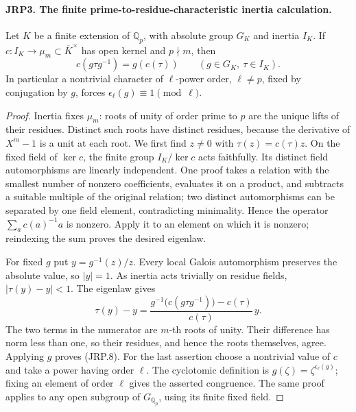 \documentclass[11pt,a4paper]{article}
\numberwithin{equation}{section}
\theoremstyle{remark}\newtheorem{remark}[theorem]{Remark}
\begin{document}
\paragraph{JRP3. The finite prime-to-residue-characteristic inertia calculation.}
\label{claim:JRP3}
Let \(K\) be a finite extension of \(\mathbb Q_p\), with
absolute group \(G_K\) and inertia \(I_K\).  If
\(c:I_K\to\mu_m\subset\overline K^\times\) has open kernel
and \(p\nmid m\), then
\[
 c(g\tau g^{-1})=g(c(\tau))
       \qquad(g\in G_K,\ \tau\in I_K).
 \tag{JRP.8}
\]
In particular a nontrivial character of \(\ell\)-power order,
\(\ell\ne p\), fixed by conjugation by \(g\), forces
\(\epsilon_\ell(g)\equiv1\pmod\ell\).
\begin{proof}
Inertia fixes \(\mu_m\): roots of unity of order prime to \(p\)
are the unique lifts of their residues.  Distinct such roots have
distinct residues, because the derivative of \(X^m-1\) is a unit
at each root.  We first find \(z\ne0\) with
\(\tau(z)=c(\tau)z\).  On the fixed field of \(\ker c\),
the finite group \(I_K/\ker c\) acts faithfully.  Its distinct
field automorphisms are linearly independent.  One proof takes a
relation with the smallest number of nonzero coefficients,
evaluates it on a product, and subtracts a suitable multiple of the
original relation; two distinct automorphisms can be separated by
one field element, contradicting minimality.  Hence the operator
\(\sum_a c(a)^{-1}a\) is nonzero.  Apply it to an element on
which it is nonzero; reindexing the sum proves the desired eigenlaw.

For fixed \(g\) put \(y=g^{-1}(z)/z\).  Every local Galois
automorphism preserves the absolute value, so \(|y|=1\).
As inertia acts trivially on residue fields,
\(|\tau(y)-y|<1\).  The eigenlaw gives
\[
 \tau(y)-y=
 \frac{g^{-1}\bigl(c(g\tau g^{-1})\bigr)-c(\tau)}{c(\tau)}\,y.
\]
The two terms in the numerator are \(m\)-th roots of unity.
Their difference has norm less than one, so their residues, and
hence the roots themselves, agree.  Applying \(g\) proves
(JRP.8).  For the last assertion choose a nontrivial value of
\(c\) and take a power having order \(\ell\).
The cyclotomic definition is
\(g(\zeta)=\zeta^{\epsilon_\ell(g)}\); fixing an element of
order \(\ell\) gives the asserted congruence.  The same proof
applies to any open subgroup of \(G_{\mathbb Q_p}\), using its
finite fixed field.
\end{proof}

\end{document}
